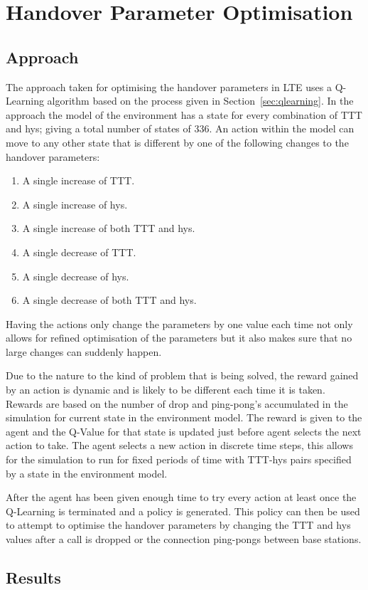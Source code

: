 \chapter{Handover Parameter Optimisation}\label{handover parameter optimisation}
\section{Approach}\label{approach}
The approach taken for optimising the handover parameters in LTE uses a Q-Learning algorithm based on the process given in Section~\ref{sec:qlearning}. In the approach the model of the environment has a state for every combination of TTT and hys; giving a total number of states of 336. An action within the model can move to any other state that is different by one of the following changes to the handover parameters:

\begin{enumerate}
	\item A single increase of TTT.
	\item A single increase of hys.
	\item A single increase of both TTT and hys.
	\item A single decrease of TTT.
	\item A single decrease of hys.
	\item A single decrease of both TTT and hys.
\end{enumerate}

Having the actions only change the parameters by one value each time not only allows for refined optimisation of the parameters but it also makes sure that no large changes can suddenly happen.

Due to the nature to the kind of problem that is being solved, the reward gained by an action is dynamic and is likely to be different each time it is taken. Rewards are based on the number of drop and ping-pong’s accumulated in the simulation for current state in the environment model. The reward is given to the agent and the Q-Value for that state is updated just before agent selects the next action to take.  The agent selects a new action in discrete time steps, this allows for the simulation to run for fixed periods of time with TTT-hys pairs specified by a state in the environment model.

After the agent has been given enough time to try every action at least once the Q-Learning is terminated and a policy is generated. This policy can then be used to attempt to optimise the handover parameters by changing the TTT and hys values after a call is dropped or the connection ping-pongs between base stations.


\section{Results}\label{results}